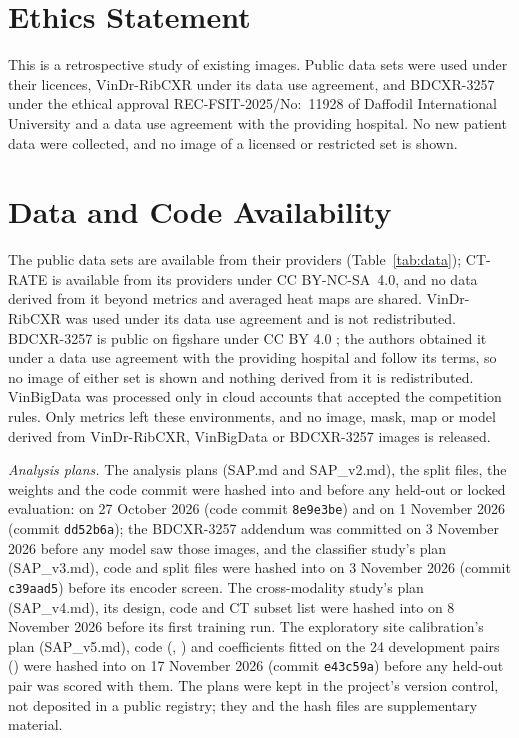 \section*{Ethics Statement}
This is a retrospective study of existing images. Public data sets were used under their licences, VinDr-RibCXR under its data use
agreement, and BDCXR-3257 under the ethical approval REC-FSIT-2025/No:~11928 of Daffodil International University and a data use agreement
with the providing hospital. No new patient data were collected, and no image of a licensed or restricted set is shown.

\section*{Data and Code Availability}
The public data sets are available from their providers (Table~\ref{tab:data}); CT-RATE \cite{hamamci2026ctrate} is available from its
providers under CC BY-NC-SA~4.0, and no data derived from it beyond metrics and averaged heat maps are shared. VinDr-RibCXR was used under
its data use agreement and is not redistributed. BDCXR-3257 is public on figshare under CC BY 4.0 \cite{durjoy2026bdcxr}; the authors
obtained it under a data use agreement with the providing hospital and follow its terms, so no image of either set is shown and nothing
derived from it is redistributed. VinBigData was processed only in cloud accounts that accepted the competition rules. Only metrics left
these environments, and no image, mask, map or model derived from VinDr-RibCXR, VinBigData or BDCXR-3257 images is released.

\emph{Analysis plans.} The analysis plans (SAP.md and SAP\_v2.md), the split files, the weights and the code commit were hashed into
 and  before any held-out or locked evaluation:  on 27 October 2026 (code commit
\texttt{8e9e3be}) and  on 1 November 2026 (commit \texttt{dd52b6a}); the BDCXR-3257 addendum was committed on
3 November 2026 before any model saw those images, and the classifier study's plan (SAP\_v3.md), code and split files were hashed into
 on 3 November 2026 (commit \texttt{c39aad5}) before its encoder screen. The cross-modality study's plan (SAP\_v4.md),
its design, code and CT subset list were hashed into  on 8 November 2026 before its first training run. The
exploratory site calibration's plan (SAP\_v5.md), code (, ) and coefficients fitted on the
24 development pairs () were hashed into  on 17 November 2026 (commit \texttt{e43c59a})
before any held-out pair was scored with them. The plans were kept in the project's version control, not deposited in a public registry;
they and the hash files are supplementary material.

